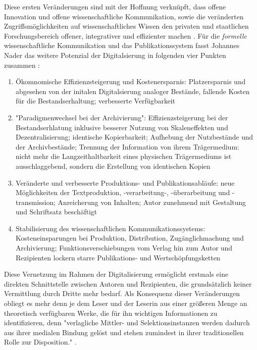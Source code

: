 Diese ersten Veränderungen sind mit der Hoffnung verknüpft, dass offene Innovation und offene wissenschaftliche Kommunikation, sowie die veränderten Zugriffsmöglichkeiten auf wissenschaftliches Wissen \cite[:109]{naeder_2010_open} den privaten und staatlichen Forschungsbereich offener, integrativer und effizienter machen \cite{harmon_2012_commercialization}. Für die \textit{formelle} wissenschaftliche Kommunikation und das Publikationssystem fasst Johannes Nader das weitere Potenzial der Digitalsierung in folgenden vier Punkten zusammen \cite[:66-76]{naeder_2010_open}:
\begin{enumerate}
\item Ökomnomische Effizienzsteigerung und Kostenersparnis: Platzersparnis und abgesehen von der initalen Digitalsierung analoger Bestände, fallende Kosten für die Bestandserhaltung; verbesserte Verfügbarkeit
\item "Paradigmenwechsel bei der Archivierung": Effizienzsteigerung bei der Bestandserhlatung inklusive besserer Nutzung von Skaleneffekten und Dezentralisierung; identische Kopierbarkeit; Aufhebung der Nutzbestände und der Archivbestände; Trennung der Information von ihrem Trägermedium: nicht mehr die Langzeithaltbarkeit eines physischen Trägermediums ist ausschlaggebend, sondern die Erstellung von identischen Kopien
\item Veränderte und verbesserte Produktions- und Publikationsabläufe: neue Möglichkeiten der Textproduktion, -verarbeitung-, -überarbeitung und -transmission; Anreicherung von Inhalten; Autor zunehmend mit Gestaltung und Schriftsatz beschäftigt
\item Stabilisierung des wissenschaftlichen Kommunikationssystems: Kosteneinsparungen bei Produktion, Distribution, Zugänglichmachung und Archivierung; Funktionsverschiebungen vom Verlag hin zum Autor und Rezipienten lockern starre Publikations- und Wertschöpfungsketten
\end{enumerate}

Diese Vernetzung im Rahmen der Digitalisierung ermöglicht erstmals eine direkten Schnittstelle zwischen Autoren und Rezipienten, die grundsätzlich keiner Vermittlung durch Dritte mehr bedarf. Als Konsequenz dieser Veränderungen obliegt es mehr denn je dem Leser und der Leserin aus einer größeren Menge an theoretisch verfügbaren Werke, die für ihn wichtigen Informationen zu identifizieren, denn "verlagliche Mittler- und Selektionsinstanzen werden dadurch aus ihrer medialen Bindung gelöst und stehen zumindest in ihrer traditionellen Rolle zur Disposition." \cite[:109]{naeder_2010_open}.

